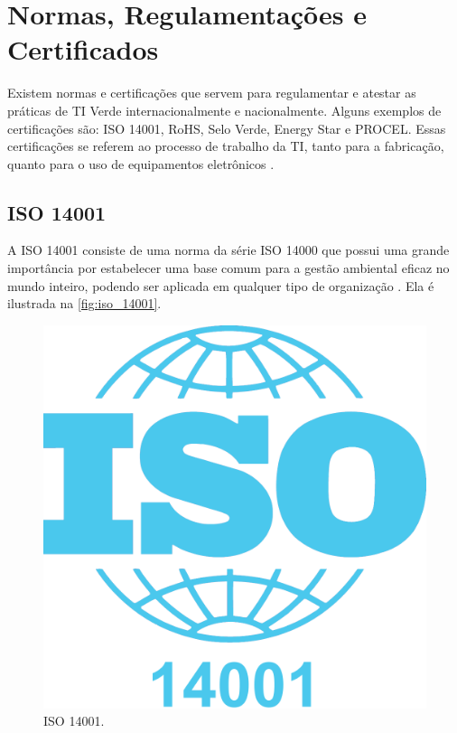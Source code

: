 \section{Normas, Regulamentações e Certificados}

Existem normas e certificações que servem para regulamentar e atestar as práticas de TI Verde internacionalmente e nacionalmente. Alguns exemplos de certificações são: ISO 14001, RoHS, Selo Verde, Energy Star e PROCEL. Essas certificações se referem ao processo de trabalho da TI, tanto para a fabricação, quanto para o uso de equipamentos eletrônicos \cite{pinto2011estudo}. 

\subsection{ISO 14001}

A ISO 14001 consiste de uma norma da série ISO 14000 que possui uma grande importância por estabelecer uma base comum para a gestão ambiental eficaz no mundo inteiro, podendo ser aplicada em qualquer tipo de organização \cite{seiffert2005iso}. Ela é ilustrada na \autoref{fig:iso_14001}. 

\begin{figure}[htb]
	\caption{\label{fig:iso_14001}ISO 14001.}
	\begin{center}
	    \includegraphics[scale=0.35]{imagens/iso-14001.png}
	\end{center}
\end{figure}

